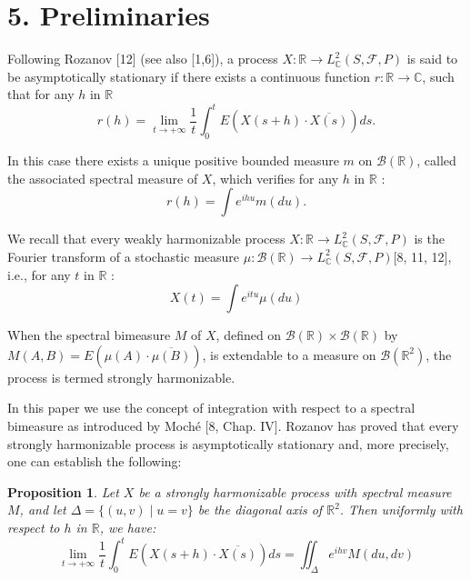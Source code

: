 \documentclass{article}
\begin{document}
\section*{5. Preliminaries} %

Following Rozanov [12] (see also [1,6]), a process \(X: \mathbb{R} \rightarrow L_{\mathbb{C}}^{2}(S, \mathscr{F}, P)\) is said to be asymptotically stationary if there exists a continuous function \(r: \mathbb{R} \rightarrow \mathbb{C}\), such that for any \(h\) in \(\mathbb{R}\)
\[
r(h)=\lim _{t \rightarrow+\infty} \frac{1}{t} \int_{0}^{t} E(X(s+h) \cdot \overline{X(s)}) d s .
\]

In this case there exists a unique positive bounded measure \(m\) on \(\mathscr{B}(\mathbb{R})\), called the associated spectral measure of \(X\), which verifies for any \(h\) in \(\mathbb{R}\) :
\[
r(h)=\int e^{i h u} m(d u) .
\]

We recall that every weakly harmonizable process \(X: \mathbb{R} \rightarrow L_{\mathbb{C}}^{2}(S, \mathscr{F}, P)\) is the Fourier transform of a stochastic measure \(\mu: \mathscr{B}(\mathbb{R}) \rightarrow L_{\mathbb{C}}^{2}(S, \mathscr{F}, P)[8\), 11, 12], i.e., for any \(t\) in \(\mathbb{R}\) :
\[
X(t)=\int e^{i t u} \mu(d u)
\]

When the spectral bimeasure \(M\) of \(X\), defined on \(\mathscr{B}(\mathbb{R}) \times \mathscr{B}(\mathbb{R})\) by \(M(A, B)=E(\mu(A) \cdot \overline{\mu(B)})\), is extendable to a measure on \(\mathscr{B}\left(\mathbb{R}^{2}\right)\), the process is termed strongly harmonizable.

In this paper we use the concept of integration with respect to a spectral bimeasure as introduced by Moché [8, Chap. IV].
Rozanov has proved that every strongly harmonizable process is asymptotically stationary and, more precisely, one can establish the following:
\newtheorem{proposition}{Proposition}[section] %
\begin{proposition} %
Let \(X\) be a strongly harmonizable process with spectral measure \(M\), and let \(\Delta=\{(u, v) \mid u=v\}\) be the diagonal axis of \(\mathbb{R}^{2}\). Then uniformly with respect to \(h\) in \(\mathbb{R}\), we have:
\[
\lim _{t \rightarrow+\infty} \frac{1}{t} \int_{0}^{t} E(X(s+h) \cdot \overline{X(s)}) d s=\iint_{\Delta} e^{i h v} M(d u, d v)
\]
\end{proposition}
\end{document}
